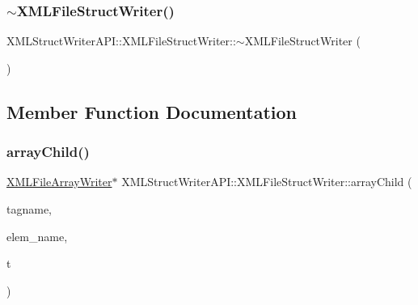 \subsubsection{\texorpdfstring{$\sim$XMLFileStructWriter()}{~XMLFileStructWriter()}\hspace{0.1cm}{\footnotesize\ttfamily [2/2]}}
{\footnotesize\ttfamily X\+M\+L\+Struct\+Writer\+A\+P\+I\+::\+X\+M\+L\+File\+Struct\+Writer\+::$\sim$\+X\+M\+L\+File\+Struct\+Writer (\begin{DoxyParamCaption}\item[{void}]{ }\end{DoxyParamCaption})\hspace{0.3cm}{\ttfamily [inline]}}



\subsection{Member Function Documentation}
\mbox{\label{classXMLStructWriterAPI_1_1XMLFileStructWriter_a45906f3eaab392974dde2da7cf1fef05}} 
\subsubsection{\texorpdfstring{arrayChild()}{arrayChild()}\hspace{0.1cm}{\footnotesize\ttfamily [1/2]}}
{\footnotesize\ttfamily \mbox{\hyperlink{classXMLStructWriterAPI_1_1XMLFileArrayWriter}{X\+M\+L\+File\+Array\+Writer}}$\ast$ X\+M\+L\+Struct\+Writer\+A\+P\+I\+::\+X\+M\+L\+File\+Struct\+Writer\+::array\+Child (\begin{DoxyParamCaption}\item[{const std\+::string \&}]{tagname,  }\item[{const std\+::string \&}]{elem\+\_\+name,  }\item[{\mbox{\hyperlink{namespaceXMLStructWriterAPI_a2017208be87c77a32bdc19ea2f14d032}{Array\+Type}}}]{t }\end{DoxyParamCaption})}

